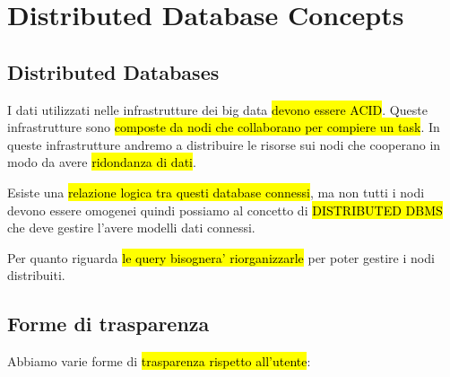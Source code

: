 \newpage
\section{Distributed Database Concepts}

\subsection{Distributed Databases}

I dati utilizzati nelle infrastrutture dei big data \hl{devono essere ACID}. Queste infrastrutture sono \hl{composte da nodi che collaborano per compiere un task}. In queste infrastrutture andremo a distribuire le risorse sui nodi che cooperano in modo da avere \hl{ridondanza di dati}.

Esiste una \hl{relazione logica tra questi database connessi}, ma non tutti i nodi devono essere omogenei quindi possiamo al concetto di \hl{DISTRIBUTED DBMS} che deve gestire l'avere modelli dati connessi. 

Per quanto riguarda \hl{le query bisognera' riorganizzarle} per poter gestire i nodi distribuiti.


\subsection{Forme di trasparenza}

Abbiamo varie forme di \hl{trasparenza rispetto all'utente}:

